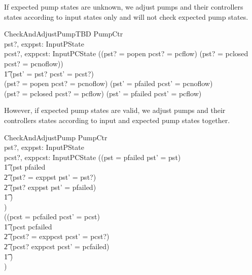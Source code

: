 \documentclass{report} %
\begin{document}
If expected pump states are unknown, we adjust pumps and their controllers states according to input states only and will not check expected pump states. 
\begin{schema}{CheckAndAdjustPumpTBD}
  \Delta PumpCtr \\ %
  pst?, exppst: InputPState \\ %
  pcst?, exppcst: InputPCState
  \where %
  ((pst? = popen \land pcst? = pcflow) \lor (pst? = pclosed \land pcst? = pcnoflow)) \\
  \t1  \implies (pst' = pst? \land pcst' = pcst?) \\
  (pst? = popen \land pcst? = pcnoflow) \implies (pst' = pfailed \land pcst' = pcnoflow) \\
  (pst? = pclosed \land pcst? = pcflow) \implies (pst' = pfailed \land pcst' = pcflow)
\end{schema}

However, if expected pump states are valid, we adjust pumps and their controllers states according to input and expected pump states together.
\begin{schema}{CheckAndAdjustPump}
  \Delta PumpCtr \\ %
  pst?, exppst: InputPState \\ %
  pcst?, exppcst: InputPCState
  \where %
  ((pst = pfailed \land pst' = pst) \lor \\
    \t1 (pst \neq pfailed \land \\
        \t2 (pst? = exppst \implies pst' = pst?) \land \\
        \t2 (pst? \neq exppst \implies pst' = pfailed)\\
    \t1 ) \\
  ) \\
  ((pcst = pcfailed \land pcst' = pcst) \lor \\
    \t1 (pcst \neq pcfailed \land \\
        \t2 (pcst? = exppcst \implies pcst' = pcst?) \land \\
        \t2 (pcst? \neq exppcst \implies pcst' = pcfailed)\\
    \t1 )\\
  ) \\
\end{schema}
\end{document}
